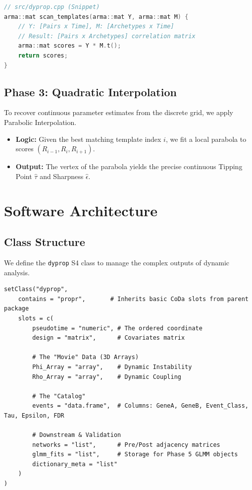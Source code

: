 \documentclass[11pt, a4paper]{article}
\begin{document}
\begin{lstlisting}[language=C++]
// src/dyprop.cpp (Snippet)
arma::mat scan_templates(arma::mat Y, arma::mat M) {
    // Y: [Pairs x Time], M: [Archetypes x Time]
    // Result: [Pairs x Archetypes] correlation matrix
    arma::mat scores = Y * M.t(); 
    return scores;
}
\end{lstlisting}

\subsection{Phase 3: Quadratic Interpolation}
To recover continuous parameter estimates from the discrete grid, we apply Parabolic Interpolation.
\begin{itemize}
    \item \textbf{Logic:} Given the best matching template index $i$, we fit a local parabola to scores $(R_{i-1}, R_i, R_{i+1})$.
    \item \textbf{Output:} The vertex of the parabola yields the precise continuous Tipping Point $\hat{\tau}$ and Sharpness $\hat{\epsilon}$.
\end{itemize}

\section{Software Architecture}

\subsection{Class Structure}
We define the \texttt{dyprop} S4 class to manage the complex outputs of dynamic analysis.

\begin{lstlisting}
setClass("dyprop",
    contains = "propr",       # Inherits basic CoDa slots from parent package
    slots = c(
        pseudotime = "numeric", # The ordered coordinate
        design = "matrix",      # Covariates matrix 
        
        # The "Movie" Data (3D Arrays)
        Phi_Array = "array",    # Dynamic Instability
        Rho_Array = "array",    # Dynamic Coupling
        
        # The "Catalog"
        events = "data.frame",  # Columns: GeneA, GeneB, Event_Class, Tau, Epsilon, FDR
        
        # Downstream & Validation
        networks = "list",      # Pre/Post adjacency matrices
        glmm_fits = "list",     # Storage for Phase 5 GLMM objects
        dictionary_meta = "list"
    )
)
\end{lstlisting}
\end{document}
